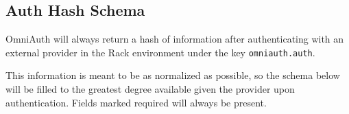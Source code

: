\subsection{Auth Hash Schema}


OmniAuth will always return a hash of information after authenticating
with an external provider in the Rack environment under the key
\verb|omniauth.auth|. 

This information is meant to be as normalized as
possible, so the schema below will be filled to the greatest degree
available given the provider upon authentication. Fields marked required
will always be present. 

